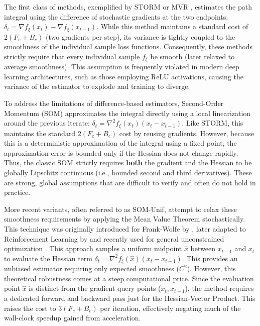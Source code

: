 \documentclass{article}
\theoremstyle{plain}
\theoremstyle{definition}
\theoremstyle{remark}
\begin{document}
The first class of methods, exemplified by STORM or MVR \citep{cutkosky2019storm}, estimates the path integral using the difference of stochastic gradients at the two endpoints: $\delta_t = \nabla f_{\xi}(x_t) - \nabla f_{\xi}(x_{t-1})$. While this method maintains a standard cost of $2(F_c+B_c)$ (two gradients per step), its variance is tightly coupled to the smoothness of the individual sample loss functions. Consequently, these methods strictly require that every individual sample $f_\xi$ be smooth (later relaxed to average smoothness). This assumption is frequently violated in modern deep learning architectures, such as those employing ReLU activations, causing the variance of the estimator to explode and training to diverge.

To address the limitations of difference-based estimators, Second-Order Momentum (SOM) \citep{tran2022better} approximates the integral directly using a local linearization around the previous iterate: $\delta_t = \nabla^2 f_{\xi}(x_{t})(x_t - x_{t-1})$. Like STORM, this maintains the standard $2(F_c+B_c)$ cost by reusing gradients. However, because this is a deterministic approximation of the integral using a fixed point, the approximation error is bounded only if the Hessian does not change rapidly. Thus, the classic SOM strictly requires \textbf{both} the gradient and the Hessian to be globally Lipschitz continuous (i.e., bounded second and third derivatives). These are strong, global assumptions that are difficult to verify and often do not hold in practice.

More recent variants, often referred to as SOM-Unif, attempt to relax these smoothness requirements by applying the Mean Value Theorem stochastically. This technique was originally introduced for Frank-Wolfe by \citet{zhang2020one}, later adapted to Reinforcement Learning by \citet{salehkaleybar2022momentum} and recently used for general unconstrained optimization \citep{sadiev2025second, khirirat2025better}. This approach samples a uniform midpoint $\hat{x}$ between $x_{t-1}$ and $x_t$ to evaluate the Hessian term $\delta_t = \nabla^2 f_\xi(\hat{x})(x_t - x_{t-1})$. This provides an unbiased estimator requiring only expected smoothness ($C^2$). However, this theoretical robustness comes at a steep computational price. Since the evaluation point $\hat{x}$ is distinct from the gradient query points ($x_t, x_{t-1}$), the method requires a dedicated forward and backward pass just for the Hessian-Vector Product. This raises the cost to $3(F_c+B_c)$ per iteration, effectively negating much of the wall-clock speedup gained from acceleration.
\end{document}
